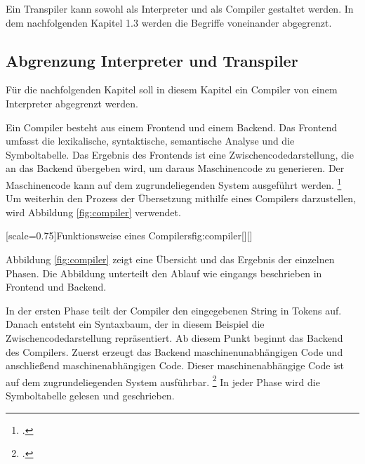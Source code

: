 Ein Transpiler kann sowohl als Interpreter und als Compiler gestaltet werden. In dem nachfolgenden Kapitel 1.3 werden die Begriffe voneinander abgegrenzt. 
	
%
	
 
    \pagebreak

\subsection{Abgrenzung Interpreter und Transpiler}
Für die nachfolgenden Kapitel soll in diesem Kapitel ein Compiler von einem Interpreter abgegrenzt werden.
  
Ein Compiler besteht aus einem Frontend und einem Backend. Das Frontend umfasst die lexikalische, syntaktische, semantische Analyse und die Symboltabelle.
Das Ergebnis des Frontends ist eine Zwischencodedarstellung, die an das Backend übergeben wird, um daraus Maschinencode zu generieren. Der Maschinencode kann auf dem zugrundeliegenden System ausgeführt werden. \footcite[Vgl. ][S.106ff. ]{aho}
Um weiterhin den Prozess der Übersetzung mithilfe eines Compilers darzustellen, wird Abbildung \ref{fig:compiler} verwendet.

\pagebreak
[scale=0.75]{Funktionsweise eines Compilers}{fig:compiler}[][]

\pagebreak
Abbildung \ref{fig:compiler} zeigt eine Übersicht und das Ergebnis der einzelnen Phasen. Die Abbildung unterteilt den Ablauf wie eingangs beschrieben in Frontend und Backend.

In der ersten Phase teilt der Compiler den eingegebenen String in Tokens auf. Danach entsteht ein Syntaxbaum, der in diesem Beispiel die Zwischencodedarstellung repräsentiert. Ab diesem Punkt beginnt das Backend des Compilers. Zuerst erzeugt das Backend maschinenunabhängigen Code und anschließend maschinenabhängigen Code. Dieser maschinenabhängige Code ist auf dem zugrundeliegenden System ausführbar. \footcite[Vgl. ][S.30 ]{aho}
In jeder Phase wird die Symboltabelle gelesen und geschrieben.


